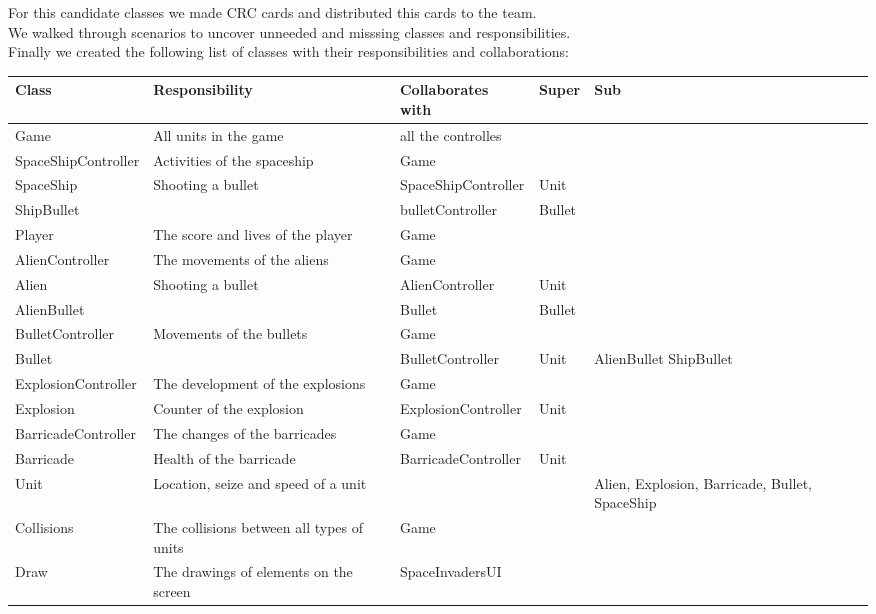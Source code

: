 \documentclass[10pt]{article}
\begin{document}
 \pagebreak
For this candidate classes we made CRC cards and distributed this cards to the team. \\
We walked through scenarios to uncover unneeded and misssing classes and responsibilities.\\
Finally we created the following list of classes with their responsibilities and collaborations:
\begin{center}
    \begin{tabular}{ | p{3cm} | p{5cm} | p{3cm} | p{2cm} | p{2cm} |}
  \hline
    Class & Responsibility & Collaborates with & Super & Sub \\ \hline
   Game & All units in the game & all the controlles & & \\ \hline
   SpaceShipController & Activities of the spaceship & Game & & \\ \hline
  SpaceShip & Shooting a bullet & SpaceShipController & Unit & \\ \hline
  ShipBullet& & bulletController & Bullet & \\ \hline
   Player & The score and lives of the player & Game & & \\ \hline
  AlienController & The movements of the aliens & Game & &  \\  \hline
   Alien & Shooting a bullet  & AlienController & Unit &  \\  \hline
   AlienBullet & & Bullet & Bullet &  \\  \hline
   BulletController & Movements of the bullets & Game & &  \\  \hline
   Bullet & &  BulletController & Unit & AlienBullet ShipBullet \\  \hline
   ExplosionController & The development of the explosions & Game & &  \\  \hline
  Explosion & Counter of the explosion & ExplosionController & Unit &  \\  \hline
  BarricadeController & The changes of the barricades & Game & &  \\  \hline
  Barricade & Health of the barricade & BarricadeController & Unit &  \\  \hline
  Unit & Location, seize and speed of a unit &  & & Alien, Explosion, Barricade, Bullet, SpaceShip  \\  \hline
  Collisions & The collisions between all types of units  & Game & &  \\  \hline
  Draw  & The drawings of elements on the screen & SpaceInvadersUI & &  \\  \hline

\end{tabular}
\end{center}
\end{document}

